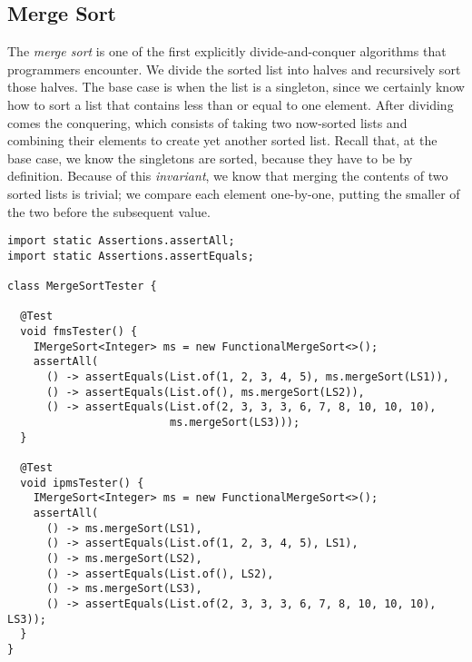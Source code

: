 \subsection{Merge Sort}

The \emph{merge sort} is one of the first explicitly divide-and-conquer algorithms that programmers encounter. We divide the sorted list into halves and recursively sort those halves. The base case is when the list is a singleton, since we certainly know how to sort a list that contains less than or equal to one element. After dividing comes the conquering, which consists of taking two now-sorted lists and combining their elements to create yet another sorted list. Recall that, at the base case, we know the singletons are sorted, because they have to be by definition. Because of this \emph{invariant}, we know that merging the contents of two sorted lists is trivial; we compare each element one-by-one, putting the smaller of the two before the subsequent value.


\begin{lstlisting}[language=MyJava]
import static Assertions.assertAll;
import static Assertions.assertEquals;

class MergeSortTester {

  @Test
  void fmsTester() {
    IMergeSort<Integer> ms = new FunctionalMergeSort<>();
    assertAll(
      () -> assertEquals(List.of(1, 2, 3, 4, 5), ms.mergeSort(LS1)),
      () -> assertEquals(List.of(), ms.mergeSort(LS2)),
      () -> assertEquals(List.of(2, 3, 3, 3, 6, 7, 8, 10, 10, 10), 
                         ms.mergeSort(LS3)));
  }

  @Test
  void ipmsTester() {
    IMergeSort<Integer> ms = new FunctionalMergeSort<>();
    assertAll(
      () -> ms.mergeSort(LS1),
      () -> assertEquals(List.of(1, 2, 3, 4, 5), LS1),
      () -> ms.mergeSort(LS2),
      () -> assertEquals(List.of(), LS2),
      () -> ms.mergeSort(LS3),
      () -> assertEquals(List.of(2, 3, 3, 3, 6, 7, 8, 10, 10, 10), LS3));
  }
}
\end{lstlisting}
  

